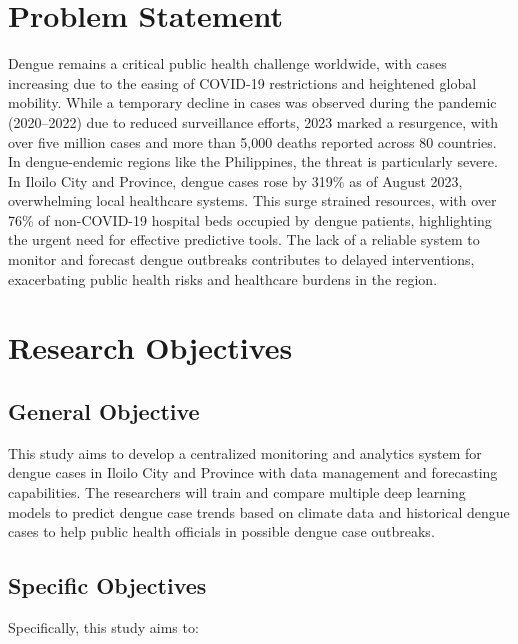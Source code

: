 \section{Problem Statement}
Dengue remains a critical public health challenge worldwide, with cases increasing due to the easing of COVID-19 restrictions and heightened global mobility. While a temporary decline in cases was observed during the pandemic (2020–2022) due to reduced surveillance efforts, 2023 marked a resurgence, with over five million cases and more than 5,000 deaths reported across 80 countries. In dengue-endemic regions like the Philippines, the threat is particularly severe. In Iloilo City and Province, dengue cases rose by 319\% as of August 2023, overwhelming local healthcare systems. This surge strained resources, with over 76\% of non-COVID-19 hospital beds occupied by dengue patients, highlighting the urgent need for effective predictive tools. The lack of a reliable system to monitor and forecast dengue outbreaks contributes to delayed interventions, exacerbating public health risks and healthcare burdens in the region. 

\section{Research Objectives}
\label{sec:researchobjectives}

\subsection{General Objective}
\label{sec:generalobjective}

This study aims to develop a centralized monitoring and analytics system for dengue cases in Iloilo City and Province with data management and forecasting capabilities. 
The researchers will train and compare multiple deep learning models to predict dengue case trends based on climate data and 
historical dengue cases to help public health officials in possible dengue case outbreaks.


\subsection{Specific Objectives}
\label{sec:specificobjectives}

Specifically, this study aims to:


